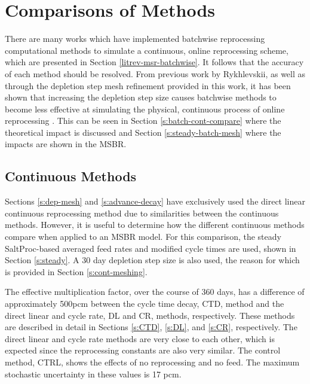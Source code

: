 \section{Comparisons of Methods}

There are many works which have implemented batchwise reprocessing computational methods to simulate a continuous, online reprocessing scheme, which are presented in Section \ref{litrev-msr-batchwise}.
It follows that the accuracy of each method should be resolved.
From previous work by Rykhlevskii, as well as through the depletion step mesh refinement provided in this work, it has been shown that increasing the depletion step size causes batchwise methods to become less effective at simulating the physical, continuous process of online reprocessing \cite{rykhlevskii_fuel_2020}.
This can be seen in Section \ref{s:batch-cont-compare} where the theoretical impact is discussed and Section \ref{s:steady-batch-mesh} where the impacts are shown in the MSBR.

\subsection{Continuous Methods}

Sections \ref{s:dep-mesh} and \ref{s:advance-decay} have exclusively used the direct linear continuous reprocessing method due to similarities between the continuous methods.
However, it is useful to determine how the different continuous methods compare when applied to an MSBR model.
For this comparison, the steady SaltProc-based averaged feed rates and modified cycle times are used, shown in Section \ref{s:steady}.
A 30 day depletion step size is also used, the reason for which is provided in Section \ref{s:cont-meshing}.


The effective multiplication factor, over the course of 360 days, has a difference of approximately 500pcm between the cycle time decay, CTD, method and the direct linear and cycle rate, DL and CR, methods, respectively.
These methods are described in detail in Sections \ref{s:CTD}, \ref{s:DL}, and \ref{s:CR}, respectively.
The direct linear and cycle rate methods are very close to each other, which is expected since the reprocessing constants are also very similar. The control method, CTRL, shows the effects of no reprocessing and no feed.
The maximum stochastic uncertainty in these values is 17 pcm.

